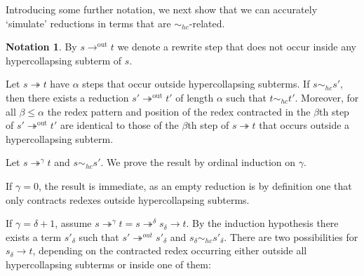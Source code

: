 \documentclass{LMCS}
\theoremstyle{plain}
\theoremstyle{definition}
\newtheorem{notation}[thm]{Notation}
\newcommand{\rew}{\rightarrow}
\newcommand{\trewt}{\twoheadrightarrow}
\newcommand{\trewtp}[1]{\twoheadrightarrow^{#1}}
\newcommand{\out}{\trewt^\mathrm{out}}
\newcommand{\outs}{\rew^\mathrm{out}}
\newcommand{\simhc}{\sim_{hc}}
\begin{document}
Introducing some further notation, we next show that we can accurately `simulate' reductions in terms that are $\simhc$-related. 

\begin{notation}
By $s \outs t$ we denote a rewrite step that does not occur inside any hypercollapsing subterm of $s$. 
\end{notation}

\begin{lem}
\label{hcoutlemma}
Let $s \trewt t$ have $\alpha$ steps that occur outside hypercollapsing subterms. If $s \simhc s'$, then there exists a reduction $s' \out t'$ of length $\alpha$ such that $t \simhc t'$. Moreover, for all $\beta \leq \alpha$ the redex pattern and position of the redex contracted in the $\beta$th step of  $s' \out t'$ are identical to those of the $\beta$th step of $s \trewt t$ that occurs outside a hypercollapsing subterm.
\end{lem}

\proof
Let $s \trewtp{\gamma} t$ and $s \simhc s'$. We prove the result by ordinal induction on $\gamma$.

If $\gamma = 0$, the result is immediate, as an empty reduction is by definition one that only contracts redexes outside hypercollapsing subterms.

If $\gamma = \delta + 1$, assume $s \trewtp{\gamma} t = s \trewtp{\delta} s_\delta \rew t$. By the induction hypothesis there exists a term $s'_\delta$ such that $s' \trewtp{out} s'_\delta$ and $s_\delta \simhc s'_\delta$. There are two possibilities for $s_\delta \rew t$, depending on the contracted redex occurring either outside all hypercollapsing subterms or inside one of them:
\end{document}
